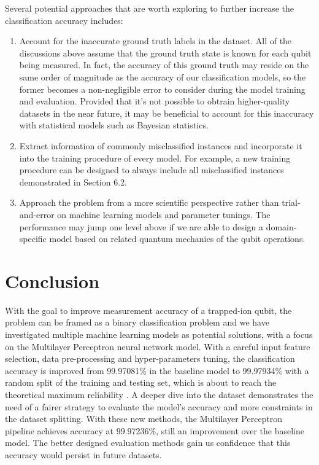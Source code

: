 \documentclass[letterpaper,twocolumn,10pt]{article}
\begin{document}
Several potential approaches that are worth exploring to further increase the classification accuracy includes:

\begin{enumerate}
    \item 
    Account for the inaccurate ground truth labels in the dataset. All of the discussions above assume that the ground truth state is known for each qubit being measured. In fact, the accuracy of this ground truth may reside on the same order of magnitude as the accuracy of our classification models, so the former becomes a non-negligible error to consider during the model training and evaluation. Provided that it's not possible to obtrain higher-quality datasets in the near future, it may be beneficial to account for this inaccuracy with statistical models such as Bayesian statistics. 

    \item 
    Extract information of commonly misclassified instances and incorporate it into the training procedure of every model. For example, a new training procedure can be designed to always include all misclassified instances demonstrated in Section 6.2.

    \item 
    Approach the problem from a more scientific perspective rather than trial-and-error on machine learning models and parameter tunings. The performance may jump one level above if we are able to design a domain-specific model based on related quantum mechanics of the qubit operations.

\end{enumerate}

\section{Conclusion}

With the goal to improve measurement accuracy of a trapped-ion qubit, the problem can be framed as a binary classification problem and we have investigated multiple machine learning models as potential solutions, with a focus on the Multilayer Perceptron neural network model. With a careful input feature selection, data pre-processing and hyper-parameters tuning, the classification accuracy is improved from 99.97081\% in the baseline model to 99.97934\% with a random split of the training and testing set, which is about to reach the theoretical maximum reliability . A deeper dive into the dataset demonstrates the need of a fairer strategy to evaluate the model's accuracy and more constraints in the dataset splitting. With these new methods, the Multilayer Perceptron pipeline achieves accuracy at 99.97236\%, still an improvement over the baseline model. The better designed evaluation methods gain us confidence that this accuracy would persist in future datasets.
\end{document}
